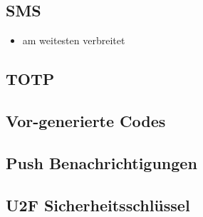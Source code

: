 \frame{\tableofcontents[sectionstyle=show/hide,subsectionstyle=show/show/hide]}

\subsection{SMS}
\begin{frame}
    \begin{itemize}
        \item am weitesten verbreitet\cite{reese2019}
    \end{itemize}
\end{frame}

\subsection{TOTP}

\subsection{Vor-generierte Codes}

\subsection{Push Benachrichtigungen}

\subsection{U2F Sicherheitsschlüssel}
